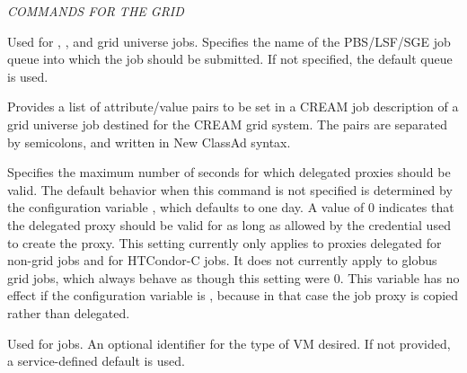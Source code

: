 \emph{COMMANDS FOR THE GRID}
\begin{description} 


\label{condor-submit-batch-queue}
\item[batch\_queue = $<$queuename$>$]
Used for , , and  
grid universe jobs.
Specifies the name of the PBS/LSF/SGE job queue into which the job should
be submitted.
If not specified, the default queue is used.


\label{condor-submit-cream-attributes}
\item[cream\_attributes = $<$name=value;\Dots;name=value$>$]
Provides a list of attribute/value pairs to be set in a CREAM job description
of a grid universe job destined for the CREAM grid system.
The pairs are separated by semicolons, and written in New ClassAd syntax.


\label{condor-submit-delegate-job-GSI-credentials-lifetime}
\item[delegate\_job\_GSI\_credentials\_lifetime = $<$seconds$>$]
Specifies the maximum number of seconds for which
delegated proxies should be valid.  
The default behavior when this command is not specified
is determined by the configuration variable 
, 
which defaults to one day.  
A value of 0 indicates that the delegated proxy
should be valid for as long as allowed by the credential used to
create the proxy.  This setting currently only applies to proxies
delegated for non-grid jobs and for HTCondor-C jobs.  It does not currently
apply to globus grid jobs, which always behave as though this setting
were 0.  This variable has no effect if the configuration
variable  is ,
because in that case the job proxy is copied rather than delegated.


\label{condor-submit-deltacloud-hardware-profile}
\item[deltacloud\_hardware\_profile = $<$Deltacloud profile name$>$]
Used for  jobs.
An optional identifier for the type of VM desired. If not provided,
a service-defined default is used.


\end{description}
